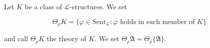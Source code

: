 Let $K$ be a class of $\mathcal{L}$-structures. We set

$$\Theta_{\rho}K = \{\varphi \in \text{Sent}_{\mathcal{L}} : \varphi \text{ holds in each member of } K\}$$

and call $\Theta_{\rho}K$ the theory of $K$. We set $\Theta_{\rho}\mathfrak{A} = \Theta_{\rho}\{\mathfrak{A}\}$.
